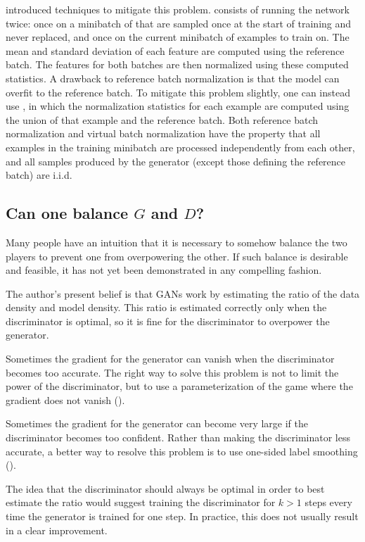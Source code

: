 \citet{salimans2016improved} introduced techniques to mitigate this problem.
 consists of running the network twice:
once on a minibatch of  that are sampled once at the
start of training and never replaced, and once on the current minibatch of examples
to train on.
The mean and standard deviation of each feature are computed using the reference
batch. The features for both batches are then normalized using these computed statistics.
A drawback to reference batch normalization is that the model can overfit to the
reference batch. To mitigate this problem slightly, one can instead use
, in which the normalization statistics for each
example are computed using the union of that example and the reference batch.
Both reference batch normalization and virtual batch normalization have the property
that all examples in the training minibatch are processed independently from each other,
and all samples produced by the generator (except those defining the reference batch)
are i.i.d.

\subsection{Can one balance $G$ and $D$?}

Many people have an intuition that it is necessary to somehow balance the two players
to prevent one from overpowering the other.
If such balance is desirable and feasible, it has not yet been demonstrated in any
compelling fashion.

The author's present belief is that GANs work by estimating the ratio of the data density
and model density. This ratio is estimated correctly only when the discriminator is
optimal, so it is fine for the discriminator to overpower the generator.

Sometimes the gradient for the generator can vanish when the discriminator becomes
too accurate.
The right way to solve this problem is not to limit the power of the discriminator,
but to use a parameterization of the game where the gradient does not vanish
().

Sometimes the gradient for the generator can become very large if the discriminator
becomes too confident. Rather than making the discriminator less accurate, a better
way to resolve this problem is to use one-sided label smoothing ().

The idea that the discriminator should always be optimal in order to best estimate
the ratio would suggest training the discriminator for $k > 1$ steps every time
the generator is trained for one step. In practice, this does not usually result in a
clear improvement.

